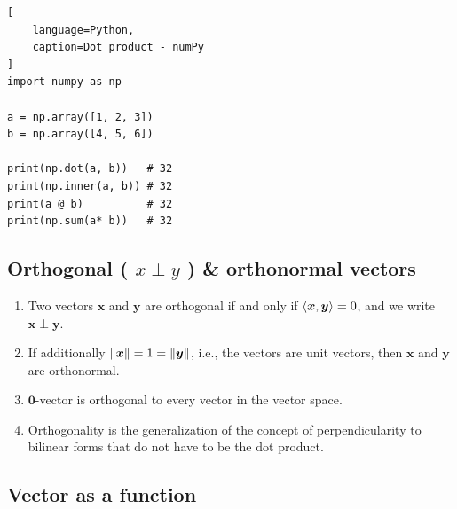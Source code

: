 \begin{lstlisting}[
    language=Python,
    caption=Dot product - numPy
]
import numpy as np

a = np.array([1, 2, 3])
b = np.array([4, 5, 6])

print(np.dot(a, b))   # 32
print(np.inner(a, b)) # 32
print(a @ b)          # 32
print(np.sum(a* b))   # 32
\end{lstlisting}











\subsection{Orthogonal ( $x \perp y$ ) \& orthonormal vectors}

\begin{enumerate}
    \item 
    \begin{definition}
        Two vectors $\bm{x}$ and $\bm{y}$ are orthogonal if and only if $\langle\bm{x}, \bm{y}\rangle = 0$, and we write $\bm{x} \perp \bm{y}$. 
        \hfill \cite{mfml/book/mml/Deisenroth-Faisal-Ong}
    \end{definition}
    
    \item If additionally $\left\| \bm{x} \right\| = 1 = \left\| \bm{y} \right\|$, i.e., the vectors are unit vectors, then $\bm{x}$ and $\bm{y}$ are orthonormal.
    \hfill \cite{mfml/book/mml/Deisenroth-Faisal-Ong}

    \item $\bm{0}$-vector is orthogonal to every vector in the vector space.
    \hfill \cite{mfml/book/mml/Deisenroth-Faisal-Ong}

    \item Orthogonality is the generalization of the concept of perpendicularity to bilinear forms that do not have to be the dot product.
    \hfill \cite{mfml/book/mml/Deisenroth-Faisal-Ong}
\end{enumerate}




\subsection{Vector as a function}


